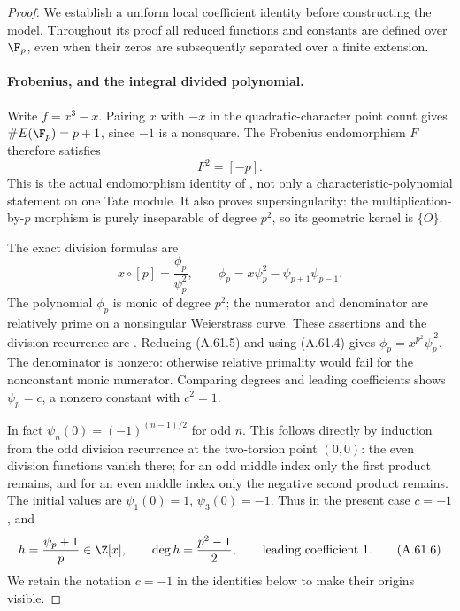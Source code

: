 \begin{proof}
We establish a uniform local coefficient identity before
constructing the model. Throughout its proof all reduced
functions and constants are defined over \(\F_p\),
even when their zeros are subsequently separated over
a finite extension.

\paragraph{Frobenius, and the integral divided polynomial.}
Write \(f=x^3-x\). Pairing \(x\) with \(-x\) in the
quadratic-character point count gives
\(\#E(\F_p)=p+1\), since \(-1\) is a nonsquare.
The Frobenius endomorphism \(F\) therefore satisfies
\[
                           F^2=[-p].                  \tag{A.61.4}
\]
This is the actual endomorphism identity of
\cite[Theorem V.2.3.1(b), p.142]{fghSilvermanAEC}, not
only a characteristic-polynomial statement on one
Tate module. It also proves supersingularity: the
multiplication-by-\(p\) morphism is purely inseparable
of degree \(p^2\), so its geometric kernel is \(\{O\}\).

The exact division formulas are
\[
 x\circ[p]=\frac{\phi_p}{\psi_p^2},\qquad
 \phi_p=x\psi_p^2-\psi_{p+1}\psi_{p-1}.
                                                        \tag{A.61.5}
\]
The polynomial \(\phi_p\) is monic of degree \(p^2\);
the numerator and denominator are relatively prime on
a nonsingular Weierstrass curve. These assertions and
the division recurrence are
\cite[Exercise III.3.7(a)--(d), pp.105--106]{fghSilvermanAEC}.
Reducing (A.61.5) and using (A.61.4) gives
\(\overline\phi_p=x^{p^2}\overline\psi_p^{\,2}\).
The denominator is nonzero: otherwise relative primality
would fail for the nonconstant monic numerator. Comparing
degrees and leading coefficients shows
\(\overline\psi_p=c\), a nonzero constant with \(c^2=1\).

In fact \(\psi_n(0)=(-1)^{(n-1)/2}\) for odd \(n\).
This follows directly by induction from the odd division
recurrence at the two-torsion point \((0,0)\): the even
division functions vanish there; for an odd middle index
only the first product remains, and for an even middle
index only the negative second product remains. The
initial values are \(\psi_1(0)=1\), \(\psi_3(0)=-1\).
Thus in the present case \(c=-1\), and
\[
             h=\frac{\psi_p+1}{p}\in\Z[x],
       \qquad \deg h=\frac{p^2-1}{2},
       \qquad \text{leading coefficient }1.           \tag{A.61.6}
\]
We retain the notation \(c=-1\) in the identities below
to make their origins visible.


\end{proof}
